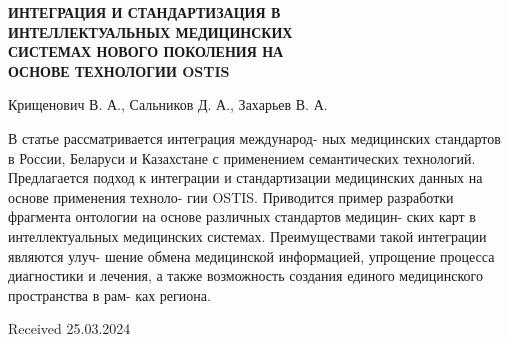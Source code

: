 \documentclass[10pt, a4paper]{article}
\begin{document}
\begin{multicols}{2}
\setlength{\parindent}{0.8cm}
\par
\setlength{\parindent}{0.3cm}
\fontsize{10}{15}\selectfont
{}
\begin{center}
\fontsize{9}{13}\selectfont
\textbf{ИНТЕГРАЦИЯ И СТАНДАРТИЗАЦИЯ В
\\
ИНТЕЛЛЕКТУАЛЬНЫХ МЕДИЦИНСКИХ
\\
СИСТЕМАХ НОВОГО ПОКОЛЕНИЯ НА
\\
ОСНОВЕ ТЕХНОЛОГИИ OSTIS}
\end{center}
\setlength{\parindent}{0.8cm}
\par
\setlength{\parindent}{0.3cm}
\fontsize{9}{15}\selectfont
{}
\par
    Крищенович В. А., Сальников Д. А., Захарьев В. А.
\setlength{\parindent}{0.8cm}
\setlength{\parindent}{0.3cm}
\fontsize{9}{15}\selectfont
{}
\par
В статье рассматривается интеграция международ-
ных медицинских стандартов в России, Беларуси и
Казахстане с применением семантических технологий.
Предлагается подход к интеграции и стандартизации
медицинских данных на основе применения техноло-
гии OSTIS. Приводится пример разработки фрагмента
онтологии на основе различных стандартов медицин-
ских карт в интеллектуальных медицинских системах.
Преимуществами такой интеграции являются улуч-
шение обмена медицинской информацией, упрощение
процесса диагностики и лечения, а также возможность
создания единого медицинского пространства в рам-
ках региона.
\par
\hfill Received 25.03.2024
\end{multicols}
\end{document}
